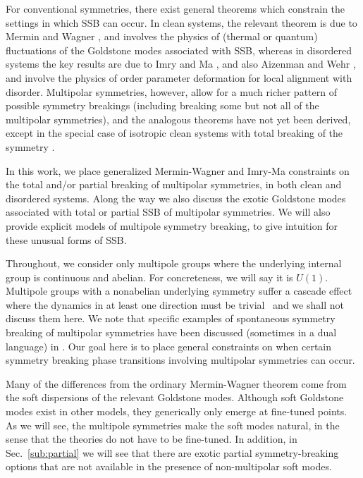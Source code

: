 \documentclass[prb,aps,twocolumn, amsfonts,amsmath,amssymb,nofootinbib,superscriptaddress]{revtex4-2}
\begin{document}
For conventional symmetries, there exist general theorems which constrain the settings in which SSB can occur. In clean systems, the relevant theorem is due to Mermin and Wagner \cite{MerminWagner}, and involves the physics of (thermal or quantum) fluctuations of the Goldstone modes associated with SSB, whereas in disordered systems the key results are due to Imry and Ma \cite{ImryMa, Vojta2013}, and also Aizenman and Wehr \cite{Aizenman}, and involve the physics of order parameter deformation for local alignment with disorder. Multipolar symmetries, however, allow for a much richer pattern of possible symmetry breakings (including breaking some but not all of the multipolar symmetries), and the analogous theorems have not yet been derived, except in the special case of isotropic clean systems with total breaking of the symmetry \cite{Griffin2013Multi}.

In this work, we place generalized Mermin-Wagner and Imry-Ma constraints on the total and/or partial breaking of multipolar symmetries, in both clean and disordered systems. Along the way we also discuss the exotic Goldstone modes associated with total or partial SSB of multipolar symmetries. We will also provide explicit models of multipole symmetry breaking, to give intuition for these unusual forms of SSB. 

Throughout, we consider only multipole groups where the underlying internal group is continuous and abelian. For concreteness, we will say it is $U(1)$. Multipole groups with a nonabelian underlying symmetry suffer a cascade effect where the dynamics in at least one direction must be trivial~\cite{nonabelian} and we shall not discuss them here. We note that specific examples of spontaneous symmetry breaking of multipolar symmetries have been discussed (sometimes in a dual language) in \cite{elastic1, elastic2, elastic3, elastic4, elastic5, FS1, FS2}. Our goal here is to place general constraints on when certain symmetry breaking phase transitions involving multipolar symmetries can occur. 

Many of the differences from the ordinary Mermin-Wagner theorem come from the soft dispersions of the relevant Goldstone modes. Although soft Goldstone modes exist in other models, they generically only emerge at fine-tuned points. As we will see, the multipole symmetries make the soft modes natural, in the sense that the theories do not have to be fine-tuned. In addition, in Sec.~\ref{sub:partial} we will see that there are exotic partial symmetry-breaking options that are not available in the presence of non-multipolar soft modes. 
\end{document}
